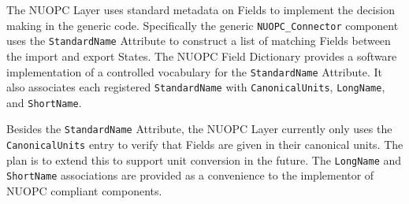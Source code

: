 %
The NUOPC Layer uses standard metadata on Fields to implement the decision making in the generic code. Specifically the generic {\tt NUOPC\_Connector} component uses the {\tt StandardName} Attribute to construct a list of matching Fields between the import and export States. The NUOPC Field Dictionary provides a software implementation of a controlled vocabulary for the {\tt StandardName} Attribute. It also associates each registered {\tt StandardName} with {\tt CanonicalUnits}, {\tt LongName}, and {\tt ShortName}.

Besides the {\tt StandardName} Attribute, the NUOPC Layer currently only uses the {\tt CanonicalUnits} entry to verify that Fields are given in their canonical units. The plan is to extend this to support unit conversion in the future. The {\tt LongName} and {\tt ShortName} associations are provided as a convenience to the implementor of NUOPC compliant components.
